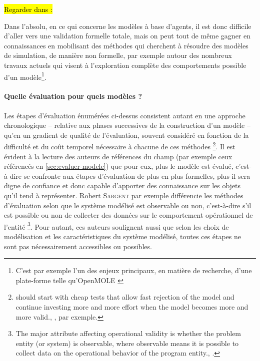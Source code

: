 \hl{Regarder dans :} \textcite[1590-1591]{epstein2006remarks}

Dans l'absolu, en ce qui concerne les modèles à base d'agents, il est donc difficile d'aller vers une validation formelle totale, mais on peut tout de même gagner en connaissances en mobilisant des méthodes qui cherchent à \og résoudre \fg{} des modèles de simulation, de manière non formelle, par exemple autour des nombreux travaux actuels \autocite[par exemple][]{cherel_beyond_2015} qui visent à l'exploration complète des comportements possible d'un modèle\footnote{
	C'est par exemple l'un des enjeux principaux, en matière de recherche, d'une plate-forme telle qu'OpenMOLE \autocite{reuillon_openmole_2013}
}.

\paragraph{Quelle évaluation pour quels modèles ?}\label{par:quelle-eval-quel-modeles}

Les étapes d'évaluation énumérées ci-dessus consistent autant en une approche chronologique -- relative aux phases successives de la construction d'un modèle -- qu'en un gradient de qualité de l'évaluation, souvent considéré en fonction de la difficulté et du coût temporel nécessaire à chacune de ces méthodes
\footnote{
	\og [One] should start with cheap tests that allow fast rejection of the model and continue investing more and more effort when the model becomes more and more valid.\fg{}, \textcite[42]{klugl_validation_2008}, par exemple.
}.
Il est évident à la lecture des auteurs de références du champ (par exemple ceux référencés en \cref{sec:evaluer-modele}) que pour eux, \og plus\fg{} le modèle est évalué, c'est-à-dire se confronte aux étapes d'évaluation de plus en plus formelles, plus il sera digne de confiance et donc capable d'apporter des connaissance sur les objets qu'il tend à représenter.
Robert \textsc{Sargent} par exemple différencie les méthodes d'évaluation selon que le système modélisé est observable ou non, c'est-à-dire \og s'il est possible ou non de collecter des données sur le comportement opérationnel de l'entité \fg{}
\footnote{
	\og The major attribute affecting operational validity is whether the problem entity (or system) is observable, where observable means it is possible to collect data on the operational behavior of the program entity.\fg{}, \textcite[6]{sargent2009verification}.
}.
Pour autant, ces auteurs soulignent aussi que selon les choix de modélisation et les caractéristiques du système modélisé, toutes ces étapes ne sont pas nécessairement accessibles ou possibles.

